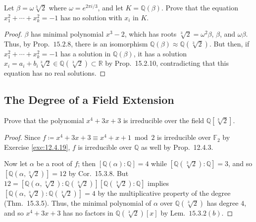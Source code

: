\documentclass[12pt]{article}
\theoremstyle{remark}
\begin{document}
\setcounter{subsubsection}{2}
\begin{problem}
  Let $\beta = \omega \sqrt[3]{2}$ where $\omega = e^{2\pi i/3}$, and let $K = \mathbb{Q}(\beta)$.  Prove that the equation $x_1^2 + \cdots + x_k^2 = -1$ has no solution with $x_i$ in $K$.
\end{problem}
\begin{proof}
  $\beta$ has minimal polynomial $x^3-2$, which has roots $\sqrt[3]{2} = \omega^2\beta$, $\beta$, and $\omega\beta$. Thus, by Prop.~$15.2.8$, there is an isomorphism $\mathbb{Q}(\beta)\approx \mathbb{Q}(\sqrt[3]{2})$. But then, if $x_1^2 + \cdots + x_k^2 = -1$ has a solution in $\mathbb{Q}(\beta)$, it has a solution $x_i = a_i + b_i\sqrt[3]{2} \in \mathbb{Q}(\sqrt[3]{2}) \subset \mathbb{R}$ by Prop.~15.2.10, contradicting that this equation has no real solutions.
\end{proof}

\subsection{The Degree of a Field Extension}
\setcounter{subsubsection}{1}
\begin{problem}
  Prove that the polynomial $x^4 + 3x + 3$ is irreducible over the field $\mathbb{Q}[\sqrt[3]{2}]$.
\end{problem}
\begin{proof}
  Since $f \coloneqq x^4 + 3x + 3 \equiv x^4 + x + 1 \bmod 2$ is irreducible over $\mathbb{F}_2$ by Exercise \ref{exc:12.4.19}, $f$ is irreducible over $\mathbb{Q}$ as well by Prop.~12.4.3.
  \par Now let $\alpha$ be a root of $f$; then $[\mathbb{Q}(\alpha) : \mathbb{Q}] = 4$ while $[\mathbb{Q}(\sqrt[3]{2}) : \mathbb{Q}] = 3$, and so $[\mathbb{Q}(\alpha,\sqrt[3]{2})] = 12$ by Cor.~15.3.8. But $12 = [\mathbb{Q}(\alpha, \sqrt[3]{2}) : \mathbb{Q}(\sqrt[3]{2})][\mathbb{Q}(\sqrt[3]{2}) : \mathbb{Q}]$ implies $[\mathbb{Q}(\alpha, \sqrt[3]{2}) : \mathbb{Q}(\sqrt[3]{2})] = 4$ by the multiplicative property of the degree (Thm.~15.3.5). Thus, the minimal polynomial of $\alpha$ over $\mathbb{Q}(\sqrt[3]{2})$ has degree $4$, and so $x^4 + 3x + 3$ has no factors in $\mathbb{Q}(\sqrt[3]{2})[x]$ by Lem.~$15.3.2(b)$.
\end{proof}
\end{document}
